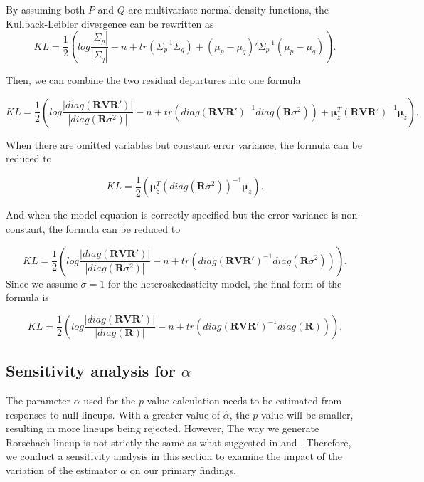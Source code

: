 \documentclass[]{interact}
\theoremstyle{plain}%
\theoremstyle{definition}
\theoremstyle{remark}
\begin{document}
By assuming both \(P\) and \(Q\) are multivariate normal density
functions, the Kullback-Leibler divergence can be rewritten as
\[KL = \frac{1}{2}\left(log\frac{|\Sigma_p|}{|\Sigma_q|} - n + tr(\Sigma_p^{-1}\Sigma_q) + (\mu_p - \mu_q)'\Sigma_p^{-1}(\mu_p - \mu_q)\right).\]

Then, we can combine the two residual departures into one formula

\small

\begin{equation*}
\label{eq:effect-size}
KL = \frac{1}{2}\left(log\frac{|diag(\boldsymbol{R}\boldsymbol{V}\boldsymbol{R}')|}{|diag(\boldsymbol{R}\sigma^2)|} - n + tr(diag(\boldsymbol{R}\boldsymbol{V}\boldsymbol{R}')^{-1}diag(\boldsymbol{R}\sigma^2)) + \boldsymbol{\mu}_z^{T}(\boldsymbol{R}\boldsymbol{V}\boldsymbol{R}')^{-1}\boldsymbol{\mu}_z\right).
\end{equation*}

\normalsize

When there are omitted variables but constant error variance, the
formula can be reduced to

\[KL = \frac{1}{2}\left(\boldsymbol{\mu}_z^{T}(diag(\boldsymbol{R}\sigma^2))^{-1}\boldsymbol{\mu}_z\right).\]

And when the model equation is correctly specified but the error
variance is non-constant, the formula can be reduced to

\[KL = \frac{1}{2}\left(log\frac{|diag(\boldsymbol{R}\boldsymbol{V}\boldsymbol{R}')|}{|diag(\boldsymbol{R}\sigma^2)|} - n + tr(diag(\boldsymbol{R}\boldsymbol{V}\boldsymbol{R}')^{-1}diag(\boldsymbol{R}\sigma^2))\right).\]
Since we assume \(\sigma = 1\) for the heteroskedasticity model, the
final form of the formula is

\[KL = \frac{1}{2}\left(log\frac{|diag(\boldsymbol{R}\boldsymbol{V}\boldsymbol{R}')|}{|diag(\boldsymbol{R})|} - n + tr(diag(\boldsymbol{R}\boldsymbol{V}\boldsymbol{R}')^{-1}diag(\boldsymbol{R}))\right).\]

\hypertarget{sensitivity-analysis-for-alpha}{%
\subsection{\texorpdfstring{Sensitivity analysis for
\(\alpha\)}{Sensitivity analysis for \textbackslash alpha}}\label{sensitivity-analysis-for-alpha}}

The parameter \(\alpha\) used for the \(p\)-value calculation needs to
be estimated from responses to null lineups. With a greater value of
\(\hat{\alpha}\), the \(p\)-value will be smaller, resulting in more
lineups being rejected. However, The way we generate Rorschach lineup is
not strictly the same as what suggested in
\citet{vanderplas2021statistical} and \citet{buja2009statistical}.
Therefore, we conduct a sensitivity analysis in this section to examine
the impact of the variation of the estimator \(\alpha\) on our primary
findings.
\end{document}

